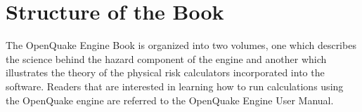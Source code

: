 %
%

%
\section{Structure of the Book}
The OpenQuake Engine Book is organized into two volumes, one which describes the science behind the hazard component of the engine
and another which illustrates the theory of the physical risk calculators incorporated into the software. Readers that are interested in learning how to run calculations using the OpenQuake engine are referred to the OpenQuake Engine User Manual.

